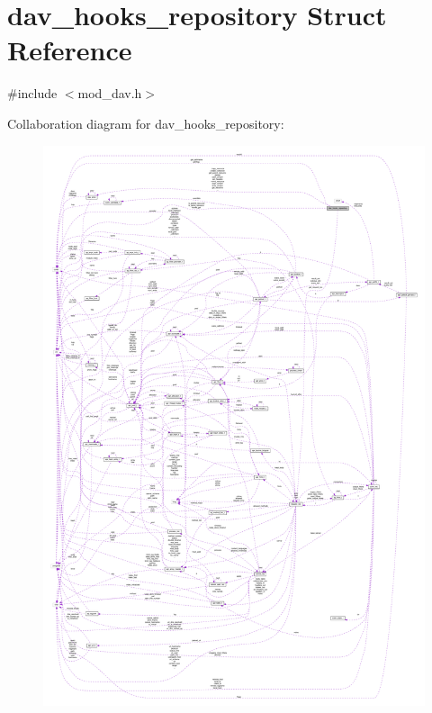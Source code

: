 \hypertarget{structdav__hooks__repository}{}\section{dav\+\_\+hooks\+\_\+repository Struct Reference}
\label{structdav__hooks__repository}


{\ttfamily \#include $<$mod\+\_\+dav.\+h$>$}



Collaboration diagram for dav\+\_\+hooks\+\_\+repository\+:
\nopagebreak
\begin{figure}[H]
\begin{center}
\leavevmode
\includegraphics[width=350pt]{structdav__hooks__repository__coll__graph}
\end{center}
\end{figure}
